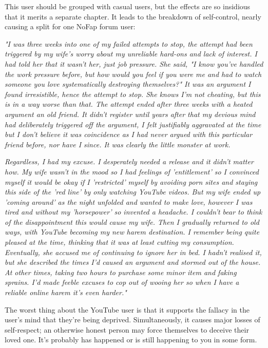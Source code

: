\documentclass[easypeasy.tex]{subfiles}
\begin{document}
This user should be grouped with casual users, but the effects are so insidious that it merits a separate chapter. It leads to the breakdown of self-control, nearly causing a split for one NoFap forum user:

\textit{"I was three weeks into one of my failed attempts to stop, the attempt had been triggered by my wife's worry about my unreliable hard-ons and lack of interest. I had told her that it wasn't her, just job pressure. She said, "I know you've handled the work pressure before, but how would you feel if you were me and had to watch someone you love systematically destroying themselves?" It was an argument I found irresistible, hence the attempt to stop. She knows I'm not cheating, but this is in a way worse than that. The attempt ended after three weeks with a heated argument an old friend. It didn't register until years after that my devious mind had deliberately triggered off the argument, I felt justifiably aggravated at the time but I don't believe it was coincidence as I had never argued with this particular friend before, nor have I since. It was clearly the little monster at work.}

\textit{Regardless, I had my excuse. I desperately needed a release and it didn't matter how. My wife wasn't in the mood so I had feelings of 'entitlement' so I convinced myself it would be okay if I 'restricted' myself by avoiding porn sites and staying this side of the 'red line' by only watching YouTube videos. But my wife ended up 'coming around' as the night unfolded and wanted to make love, however I was tired and without my 'horsepower' so invented a headache. I couldn't bear to think of the disappointment this would cause my wife. Then I gradually returned to old ways, with YouTube becoming my new harem destination. I remember being quite pleased at the time, thinking that it was at least cutting my consumption. Eventually, she accused me of continuing to ignore her in bed. I hadn't realised it, but she described the times I'd caused an argument and stormed out of the house. At other times, taking two hours to purchase some minor item and faking sprains. I'd made feeble excuses to cop out of wooing her so when I have a reliable online harem it's even harder."}

The worst thing about the YouTube user is that it supports the fallacy in the user's mind that they're being deprived. Simultaneously, it causes major losses of self-respect; an otherwise honest person may force themselves to deceive their loved one. It's probably has happened or is still happening to you in some form.
\end{document}
